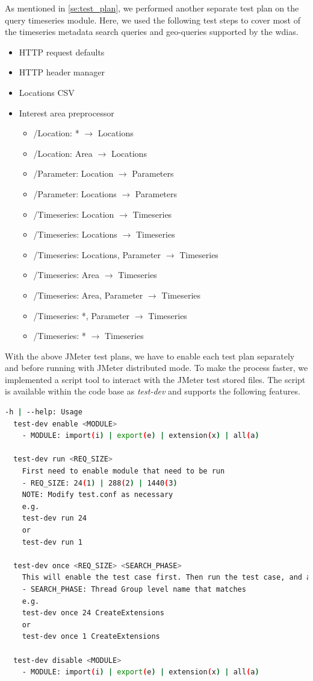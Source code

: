 As mentioned in \cref{se:test_plan}, we performed another separate test plan on the query timeseries module. Here, we used the following test steps to cover most of the timeseries metadata search queries and geo-queries supported by the \acrshort{wdias}.

\begin{itemize}
    \item HTTP request defaults
    \item HTTP header manager
    \item Locations CSV
    \item Interest area preprocessor
    \begin{itemize}
        \item /Location: * $\rightarrow$ Locations
    	\item /Location: Area $\rightarrow$ Locations
    	\item /Parameter: Location $\rightarrow$ Parameters
    	\item /Parameter: Locations $\rightarrow$ Parameters
    	\item /Timeseries: Location $\rightarrow$ Timeseries
    	\item /Timeseries: Locations $\rightarrow$ Timeseries
    	\item /Timeseries: Locations, Parameter $\rightarrow$ Timeseries
    	\item /Timeseries: Area $\rightarrow$ Timeseries
    	\item /Timeseries: Area, Parameter $\rightarrow$ Timeseries
    	\item /Timeseries: *, Parameter $\rightarrow$ Timeseries
    	\item /Timeseries: * $\rightarrow$ Timeseries
	\end{itemize}
\end{itemize}

With the above JMeter test plans, we have to enable each test plan separately and before running with JMeter distributed mode. To make the process faster, we implemented a script tool to interact with the JMeter test stored files. The script is available within the code base \cite{KarunarathneWDIASPlan} as \emph{test-dev} and supports the following features.

\begin{lstlisting}[language=sh, caption=Automated performance test plans.]
-h | --help: Usage
  test-dev enable <MODULE>
    - MODULE: import(i) | export(e) | extension(x) | all(a)

  test-dev run <REQ_SIZE>
    First need to enable module that need to be run
    - REQ_SIZE: 24(1) | 288(2) | 1440(3)
    NOTE: Modify test.conf as necessary
    e.g.
    test-dev run 24
    or
    test-dev run 1

  test-dev once <REQ_SIZE> <SEARCH_PHASE>
    This will enable the test case first. Then run the test case, and at the end disable and exit.
    - SEARCH_PHASE: Thread Group level name that matches
    e.g.
    test-dev once 24 CreateExtensions
    or
    test-dev once 1 CreateExtensions

  test-dev disable <MODULE>
    - MODULE: import(i) | export(e) | extension(x) | all(a)
\end{lstlisting}

